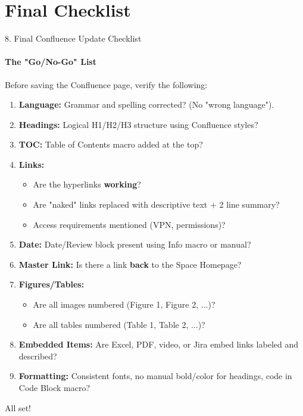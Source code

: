 \documentclass[10pt, aspectratio=169]{beamer}
\begin{document}
	\section{Final Checklist}
	\begin{frame}{8. Final Confluence Update Checklist}
		\framesubtitle{The "Go/No-Go" List}
		Before saving the Confluence page, verify the following:
		
		\pause
		\begin{enumerate}
			\item \textbf{Language:} Grammar and spelling corrected? (No "wrong language").
			\item \textbf{Headings:} Logical H1/H2/H3 structure using Confluence styles?
			\item \textbf{TOC:} Table of Contents macro added at the top?
			\item \textbf{Links:} 
			\begin{itemize}
				\item Are the hyperlinks \textbf{working}?
				\item Are "naked" links replaced with descriptive text + 2 line summary?
				\item Access requirements mentioned (VPN, permissions)?
			\end{itemize}
			\item \textbf{Date:} Date/Review block present using Info macro or manual?
			\item \textbf{Master Link:} Is there a link \textbf{back} to the Space Homepage?
			\item \textbf{Figures/Tables:} 
			\begin{itemize}
				\item Are all images numbered (Figure 1, Figure 2, ...)?
				\item Are all tables numbered (Table 1, Table 2, ...)?
			\end{itemize}
			\item \textbf{Embedded Items:} Are Excel, PDF, video, or Jira embed links labeled and described?
			\item \textbf{Formatting:} Consistent fonts, no manual bold/color for headings, code in Code Block macro?
		\end{enumerate}
		
		\vfill
		\pause
		\begin{center}
			\color{blue} \Huge \checkmark \quad All set!
		\end{center}
	\end{frame}
	
\end{document}
